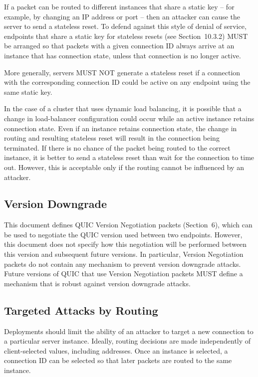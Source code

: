 \documentclass{article}
\begin{document}
If a packet can be routed to different instances that share a static key -- for example, by changing an IP address or port -- then an attacker can cause the server to send a stateless reset.  To defend against this style of denial of service, endpoints that share a static key for stateless resets (see Section~10.3.2) MUST be arranged so that packets with a given connection ID always arrive at an instance that has connection state, unless that connection is no longer active.

More generally, servers MUST NOT generate a stateless reset if a connection with the corresponding connection ID could be active on any endpoint using the same static key.

In the case of a cluster that uses dynamic load balancing, it is possible that a change in load-balancer configuration could occur while an active instance retains connection state.  Even if an instance retains connection state, the change in routing and resulting stateless reset will result in the connection being terminated.  If there is no chance of the packet being routed to the correct instance, it is better to send a stateless reset than wait for the connection to time out.  However, this is acceptable only if the routing cannot be influenced by an attacker.

\subsection{Version Downgrade}

This document defines QUIC Version Negotiation packets (Section~6), which can be used to negotiate the QUIC version used between two endpoints.  However, this document does not specify how this negotiation will be performed between this version and subsequent future versions.  In particular, Version Negotiation packets do not contain any mechanism to prevent version downgrade attacks.  Future versions of QUIC that use Version Negotiation packets MUST define a mechanism that is robust against version downgrade attacks.

\subsection{Targeted Attacks by Routing}

Deployments should limit the ability of an attacker to target a new connection to a particular server instance.  Ideally, routing decisions are made independently of client-selected values, including addresses.  Once an instance is selected, a connection ID can be selected so that later packets are routed to the same instance.
\end{document}
